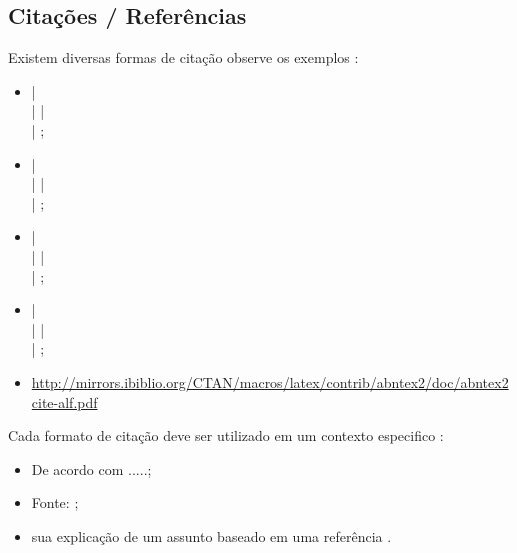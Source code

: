 \subsection{Citações / Referências}

Existem diversas formas de citação observe os exemplos :

\begin{itemize}
    \item \cite{UML:JACOBSON} | \cite{POWELL:2006} \\ 
        \cite{SCRUMGUIDE:2013} | \cite{urani1994} |\\
        \cite{ETAL5} | \cite{ETAL4}; 
    

    \item {} |  \\
         |  | \\
         | ;

    \item {}|  \\
         |  | \\
         | ;

    \item \citeauthor{UML:JACOBSON}| \citeauthor{POWELL:2006} \\
        \citeauthor{SCRUMGUIDE:2013}| \citeauthor{urani1994} | \\
        \citeauthor{ETAL5} | \citeauthor{ETAL4};
    
    
    \item \url{http://mirrors.ibiblio.org/CTAN/macros/latex/contrib/abntex2/doc/abntex2cite-alf.pdf}
\end{itemize}

Cada formato de citação deve ser utilizado em um contexto especifico :
\begin{itemize}
    \item De acordo com  .....;
    \item Fonte: ;
    \item sua explicação de um assunto baseado em uma referência \cite{SCRUMGUIDE:2013}.
\end{itemize}

